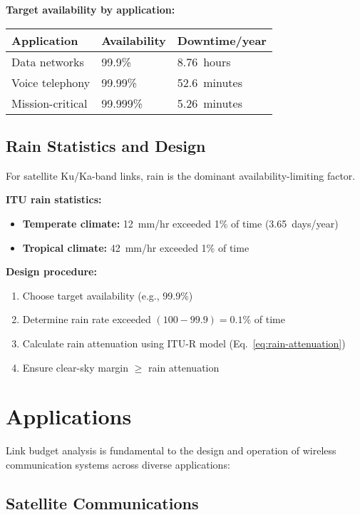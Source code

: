 \textbf{Target availability by application:}

\begin{center}
\begin{tabular}{@{}lll@{}}
\toprule
\textbf{Application} & \textbf{Availability} & \textbf{Downtime/year} \\
\midrule
Data networks & 99.9\% & 8.76~hours \\
Voice telephony & 99.99\% & 52.6~minutes \\
Mission-critical & 99.999\% & 5.26~minutes \\
\bottomrule
\end{tabular}
\end{center}

\subsection{Rain Statistics and Design}

For satellite Ku/Ka-band links, rain is the dominant availability-limiting factor.

\textbf{ITU rain statistics:}
\begin{itemize}
\item \textbf{Temperate climate:} 12~mm/hr exceeded 1\% of time (3.65~days/year)
\item \textbf{Tropical climate:} 42~mm/hr exceeded 1\% of time
\end{itemize}

\textbf{Design procedure:}
\begin{enumerate}
\item Choose target availability (e.g., 99.9\%)
\item Determine rain rate exceeded $(100 - 99.9) = 0.1\%$ of time
\item Calculate rain attenuation using ITU-R model (Eq.~\ref{eq:rain-attenuation})
\item Ensure clear-sky margin $\geq$ rain attenuation
\end{enumerate}

\section{Applications}

Link budget analysis is fundamental to the design and operation of wireless communication systems across diverse applications:

\subsection{Satellite Communications}

